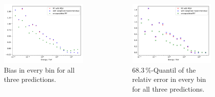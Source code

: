 \documentclass[aspectratio=1610, professionalfonts, 9pt]{beamer}
\begin{document}
  \begin{frame}
    \begin{columns}
      \begin{column}{0.5\textwidth}
        \begin{figure}
          \centering
          \includegraphics[width=\textwidth]{Plots/RF_MSV_rel_mean.pdf}
          \caption{Bias in every bin for all three predictions.}
        \end{figure}
      \end{column}
      \begin{column}{0.5\textwidth}
        \begin{figure}
          \centering
          \includegraphics[width=\textwidth]{Plots/RF_MSV_rel_std.pdf}
          \caption{$68.3\,\%$-Quantil of the relativ error in every bin for all three predictions.}
        \end{figure}
      \end{column}
    \end{columns}
  \end{frame}
\end{document}
